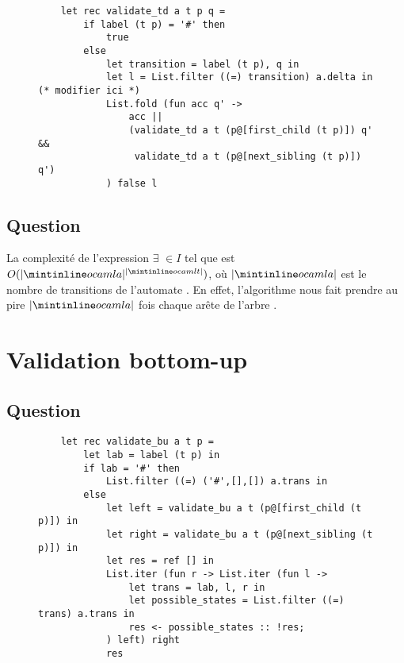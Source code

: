 \documentclass[twoside,11pt]{article}
\begin{document}
\begin{figure}[H]
  \begin{verbatim}
    let rec validate_td a t p q =
        if label (t p) = '#' then
            true
        else
            let transition = label (t p), q in
            let l = List.filter ((=) transition) a.delta in (* modifier ici *)
            List.fold (fun acc q' ->
                acc ||
                (validate_td a t (p@[first_child (t p)]) q' &&
                 validate_td a t (p@[next_sibling (t p)]) q')
            ) false l
   \end{verbatim}
\end{figure}

\subsection{Question}

La complexité de l'expression
$\exists$  $\in I$ tel que 
est $O(|\ocaml{a}|^{|\ocaml{t}|})$, où $|\ocaml{a}|$ est le nombre de
transitions de l'automate . En effet, l'algorithme
nous fait prendre au pire $|\ocaml{a}|$ fois chaque arête de l'arbre .


\section{Validation bottom-up}

\subsection{Question}
        \bigskip
\begin{figure}[H]
  \begin{verbatim}
    let rec validate_bu a t p =
        let lab = label (t p) in
        if lab = '#' then
            List.filter ((=) ('#',[],[]) a.trans in
        else
            let left = validate_bu a t (p@[first_child (t p)]) in
            let right = validate_bu a t (p@[next_sibling (t p)]) in
            let res = ref [] in
            List.iter (fun r -> List.iter (fun l ->
                let trans = lab, l, r in
                let possible_states = List.filter ((=) trans) a.trans in
                res <- possible_states :: !res;
            ) left) right
            res
   \end{verbatim}
\end{figure}
\end{document}
